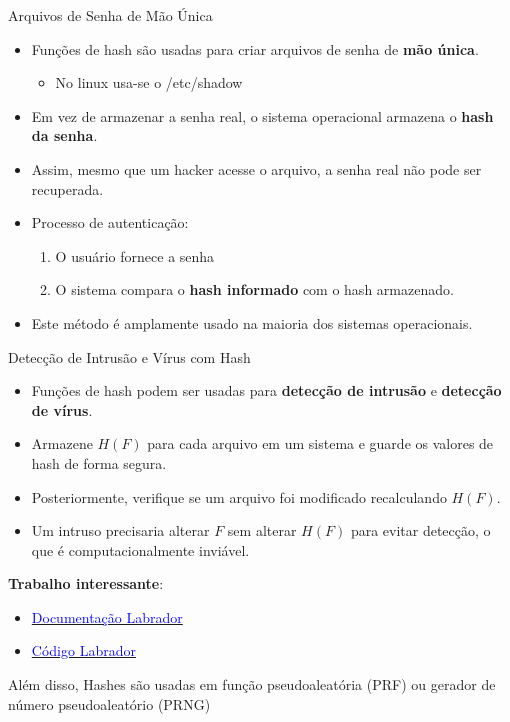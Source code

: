 \begin{frame}{Arquivos de Senha de Mão Única}
    \begin{itemize}
        \item Funções de hash são usadas para criar arquivos de senha de \textbf{mão única}.
        \begin{itemize}
            \item No linux usa-se o /etc/shadow
        \end{itemize}
        \item Em vez de armazenar a senha real, o sistema operacional armazena o \textbf{hash da senha}.
        \item Assim, mesmo que um hacker acesse o arquivo, a senha real não pode ser recuperada.
        \item Processo de autenticação:
        \begin{enumerate}
            \item O usuário fornece a senha 
            \item O sistema compara o \textbf{hash informado} com o hash armazenado.
        \end{enumerate} 
        \item Este método é amplamente usado na maioria dos sistemas operacionais.
    \end{itemize}
\end{frame}

\begin{frame}{Detecção de Intrusão e Vírus com Hash}
    \begin{itemize}
        \item Funções de hash podem ser usadas para \textbf{detecção de intrusão} e \textbf{detecção de vírus}.
        \item Armazene $H(F)$ para cada arquivo em um sistema e guarde os valores de hash de forma segura.
        \item Posteriormente, verifique se um arquivo foi modificado recalculando $H(F)$.
        \item Um intruso precisaria alterar $F$ sem alterar $H(F)$ para evitar detecção, o que é computacionalmente inviável.


        
    \end{itemize}

   \textbf{Trabalho interessante}:  

   \begin{itemize}
         \item    \href{https://labrador-ids.sourceforge.net/about.html}{\textcolor{blue}{Documentação Labrador}}
        \item \href{https://sourceforge.net/projects/labrador-ids/}{\textcolor{blue}{Código Labrador}} 
   \end{itemize}

Além disso, Hashes são usadas em função pseudoaleatória (PRF) ou gerador de número pseudoaleatório (PRNG)

\end{frame}

